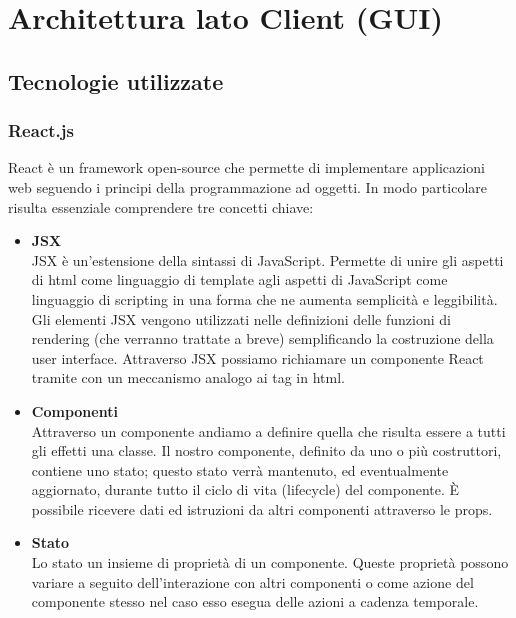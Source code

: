 \section{Architettura lato Client (GUI)}
\subsection{Tecnologie utilizzate}
\subsubsection{React.js}
React è un framework open-source che permette di implementare applicazioni web seguendo i principi della
programmazione ad oggetti. In modo particolare risulta essenziale comprendere tre concetti chiave:
\begin{itemize}
    \item \textbf{JSX}\\
    JSX è un'estensione della sintassi di JavaScript.\newline
    Permette di unire gli aspetti di html come linguaggio di template agli aspetti di JavaScript come linguaggio di scripting in una forma che ne aumenta semplicità e leggibilità.\newline
    Gli elementi JSX vengono utilizzati nelle definizioni delle funzioni di rendering (che verranno trattate a breve) semplificando la costruzione della user interface.\newline
    Attraverso JSX possiamo richiamare un componente React tramite con un meccanismo analogo ai tag in html.
    \item  \textbf{Componenti}\\
    Attraverso un componente andiamo a definire quella che risulta essere a tutti gli effetti una classe.\newline
    Il nostro componente, definito da uno o più costruttori, contiene uno stato; questo stato verrà mantenuto, ed eventualmente aggiornato, durante tutto il ciclo di vita (lifecycle) del componente.\newline
    È possibile ricevere dati ed istruzioni da altri componenti attraverso le props.\newline
    \item \textbf{Stato}\\
    Lo stato un insieme di proprietà di un componente.\newline
    Queste proprietà possono variare a seguito dell'interazione con altri componenti o come azione del componente stesso nel caso esso esegua delle azioni a cadenza temporale.\newline

\end{itemize}
